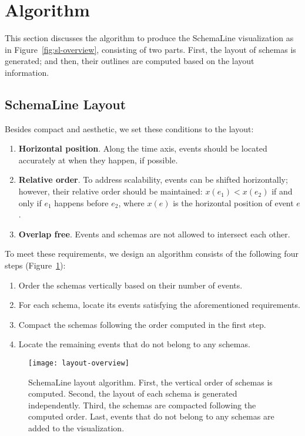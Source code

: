 \section{Algorithm}
\label{sec:sl-algorithm}

This section discusses the algorithm to produce the SchemaLine visualization as in Figure~\ref{fig:sl-overview}, consisting of two parts. First, the layout of schemas is generated; and then, their outlines are computed based on the layout information.

\subsection{SchemaLine Layout}

Besides compact and aesthetic, we set these conditions to the layout: 
\begin{enumerate}
	\item \textbf{Horizontal position}. Along the time axis, events should be located accurately at when they happen, if possible.
	\item \textbf{Relative order}. To address scalability, events can be shifted horizontally; however, their relative order should be maintained: $x(e_1) < x(e_2)$ if and only if $e_1$ happens before $e_2$, where $x(e)$ is the horizontal position of event $e$.
	\item \textbf{Overlap free}. Events and schemas are not allowed to intersect each other.
\end{enumerate}

To meet these requirements, we design an algorithm consists of the following four steps (Figure~\ref{fig:sl-layout-overview}):
\begin{enumerate} 
	\item Order the schemas vertically based on their number of events.
	\item For each schema, locate its events satisfying the aforementioned requirements.
	\item Compact the schemas following the order computed in the first step.
	\item Locate the remaining events that do not belong to any schemas. 
\end{enumerate}

\begin{figure}[!htb]
\centering
\texttt{[image: layout-overview]}
\caption{SchemaLine layout algorithm. First, the vertical order of schemas is computed. Second, the layout of each schema is generated independently. Third, the schemas are compacted following the computed order. Last, events that do not belong to any schemas are added to the visualization.}
\label{fig:sl-layout-overview}
\end{figure}


